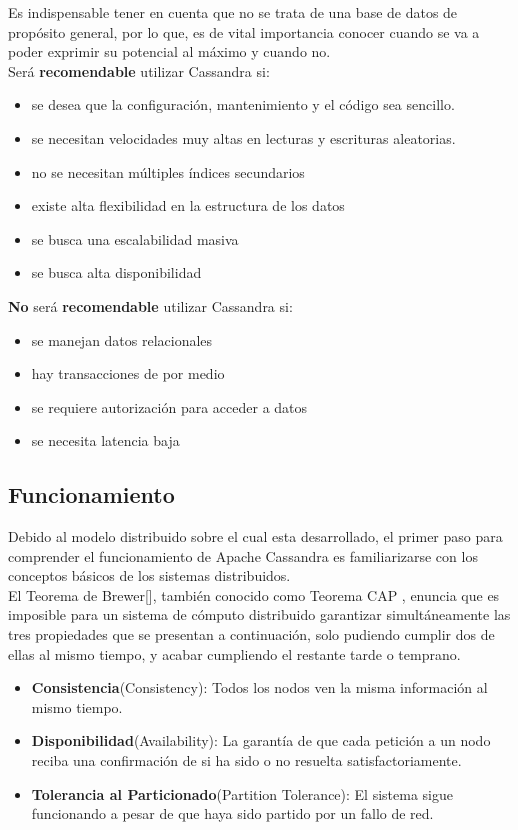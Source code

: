 Es indispensable tener en cuenta que no se trata de una base de datos de propósito general, por lo que, es de vital importancia conocer cuando se va a poder exprimir su potencial al máximo y cuando no.\\

Será \textbf{recomendable} utilizar Cassandra si:

\begin{itemize}
	\item se desea que la configuración, mantenimiento y el código sea sencillo.
	\item se necesitan velocidades muy altas en lecturas y escrituras aleatorias.
	\item no se necesitan múltiples índices secundarios
	\item existe alta flexibilidad en la estructura de los datos
	\item se busca una escalabilidad masiva
	\item se busca alta disponibilidad
\end{itemize}

\textbf{No} será \textbf{recomendable} utilizar Cassandra si:

\begin{itemize}
	\item se manejan datos relacionales
	\item hay transacciones de por medio
	\item se requiere autorización para acceder a datos
	\item se necesita latencia baja
\end{itemize}

\subsection{Funcionamiento}

Debido al modelo distribuido sobre el cual esta desarrollado, el primer paso para comprender el funcionamiento de Apache Cassandra es familiarizarse con los conceptos básicos de los sistemas distribuidos.\\

El Teorema de Brewer[], también conocido como Teorema CAP , enuncia que es imposible para un sistema de cómputo distribuido garantizar simultáneamente las tres propiedades que se presentan a continuación, solo pudiendo cumplir dos de ellas al mismo tiempo, y acabar cumpliendo el restante tarde o temprano.\\

\begin{itemize}
	\item \textbf{Consistencia}(Consistency): Todos los nodos ven la misma información al mismo tiempo.
	\item \textbf{Disponibilidad}(Availability): La garantía de que cada petición a un nodo reciba una confirmación de si ha sido o no resuelta satisfactoriamente.
	\item \textbf{Tolerancia al Particionado}(Partition Tolerance): El sistema sigue funcionando a pesar de que haya sido partido por un fallo de red.
\end{itemize}

